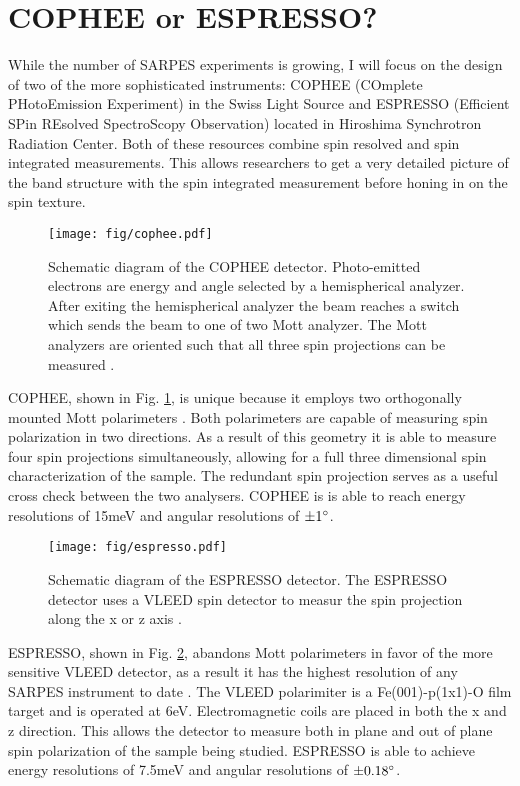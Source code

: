 \documentclass[12pt]{article}
\begin{document}
\section{COPHEE or ESPRESSO?}
While the number of SARPES experiments is growing, I will focus on the design of two of the more sophisticated instruments:  COPHEE (COmplete PHotoEmission Experiment) in the Swiss Light Source and ESPRESSO (Efficient SPin REsolved SpectroScopy Observation) located in Hiroshima Synchrotron Radiation Center.
Both of these resources combine spin resolved and spin integrated measurements.
This allows researchers to get a very detailed picture of the band structure with the spin integrated measurement before honing in on the spin texture.

\begin{figure}[h]
  \centering
  \texttt{[image: fig/cophee.pdf]}
  \caption{Schematic diagram of the COPHEE detector.  Photo-emitted electrons are energy and angle selected by a hemispherical analyzer.  After exiting the hemispherical analyzer the beam reaches a switch which sends the beam to one of two Mott analyzer.  The Mott analyzers are oriented such that all three spin projections can be measured \cite{Hoesch}.}
  \label{fig:cophee}
\end{figure}
COPHEE, shown in Fig. \ref{fig:cophee}, is unique because it employs two orthogonally mounted Mott polarimeters \cite{Hoesch}.
Both polarimeters are capable of measuring spin polarization in two directions.
As a result of this geometry it is able to measure four spin projections simultaneously, allowing for a full three dimensional spin characterization of the sample.
The redundant spin projection serves as a useful cross check between the two analysers.
COPHEE is is able to reach energy resolutions of 15meV and angular resolutions of $\pm1\degree$.

\begin{figure}[h]
  \centering
  \texttt{[image: fig/espresso.pdf]}
  \caption{Schematic diagram of the ESPRESSO detector.  The ESPRESSO detector uses a VLEED spin detector to measur the spin projection along the x or z axis \cite{Okuda}.}
  \label{fig:espresso}
\end{figure}
ESPRESSO, shown in Fig. \ref{fig:espresso}, abandons Mott polarimeters in favor of the more sensitive VLEED detector, as a result it has the highest resolution of any SARPES instrument to date \cite{Okuda}.
The VLEED polarimiter is a Fe(001)-p(1x1)-O film target and is operated at 6eV.
Electromagnetic coils are placed in both the x and z direction.
This allows the detector to measure both in plane and out of plane spin polarization of the sample being studied.
ESPRESSO is able to achieve energy resolutions of 7.5meV and angular resolutions of $\pm0.18\degree$.
\end{document}
